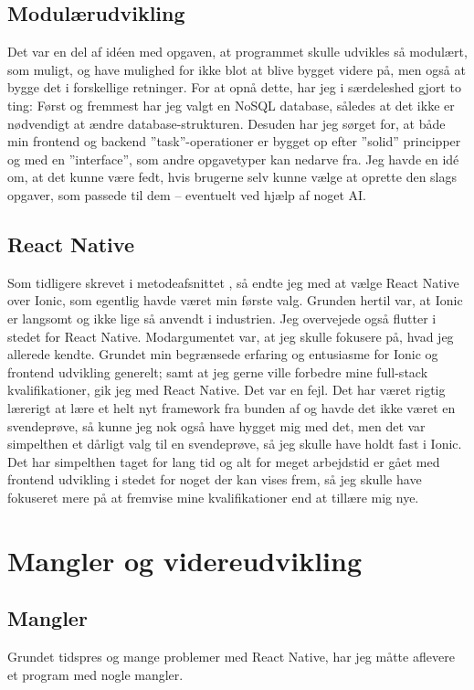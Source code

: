 \documentclass{report}
\begin{document}
\section{Modulærudvikling}
Det var en del af idéen med opgaven, at programmet skulle udvikles så modulært, som muligt, og have mulighed for ikke blot at blive bygget videre på, men også at bygge det i forskellige retninger.
For at opnå dette,  har jeg i særdeleshed gjort to ting:
Først og fremmest har jeg valgt en NoSQL database, således at det ikke er nødvendigt at ændre database-strukturen.
Desuden har jeg sørget for, at både min frontend og backend ”task”-operationer er bygget op efter ”solid” principper og med en ”interface”, som andre opgavetyper kan nedarve fra. 
Jeg havde en idé om, at det kunne være fedt, hvis brugerne selv kunne vælge at oprette den slags opgaver, som passede til dem – eventuelt ved hjælp af noget AI.

\section{React Native}
Som tidligere skrevet i metodeafsnittet , så endte jeg med at vælge React Native over Ionic, som egentlig havde været min første valg. Grunden hertil var, at Ionic er langsomt og ikke lige så anvendt i industrien. Jeg overvejede også flutter i stedet for React Native. Modargumentet var, at jeg skulle fokusere på, hvad jeg allerede kendte.
Grundet min begrænsede erfaring og entusiasme for Ionic og frontend udvikling generelt; samt at jeg gerne ville forbedre mine full-stack kvalifikationer, gik jeg med React Native. Det var en fejl.
Det har været rigtig lærerigt at lære et helt nyt framework fra bunden af og havde det ikke været en svendeprøve, så kunne jeg nok også have hygget mig med det, men det var simpelthen et dårligt valg til en svendeprøve, så jeg skulle have holdt fast i Ionic.
Det har simpelthen taget for lang tid og alt for meget arbejdstid er gået med frontend udvikling i stedet for noget der kan vises frem, så jeg skulle have fokuseret mere på at fremvise mine kvalifikationer end at tillære mig nye.

\chapter{Mangler og videreudvikling}

\section{Mangler}
Grundet tidspres og mange problemer med React Native, har jeg måtte aflevere et program med nogle mangler.
\end{document}
